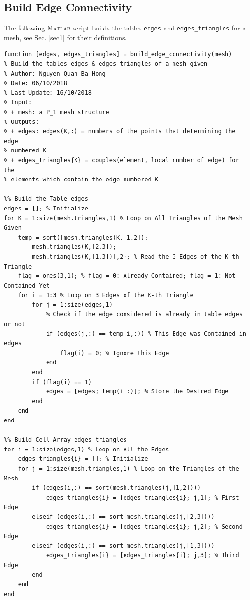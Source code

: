 \documentclass[11pt,a4paper,center,notitlepage]{article}
\numberwithin{equation}{section}
\begin{document}
\subsection{Build Edge Connectivity}\label{sec5.2}
The following \textsc{Matlab} script builds the tables \verb|edges| and \verb|edges_triangles| for a mesh, see Sec. \ref{sec1} for their definitions.
\begin{verbatim}
function [edges, edges_triangles] = build_edge_connectivity(mesh)
% Build the tables edges & edges_triangles of a mesh given
% Author: Nguyen Quan Ba Hong
% Date: 06/10/2018
% Last Update: 16/10/2018
% Input:
% + mesh: a P_1 mesh structure
% Outputs:
% + edges: edges(K,:) = numbers of the points that determining the edge
% numbered K
% + edges_triangles{K} = couples(element, local number of edge) for the
% elements which contain the edge numbered K

%% Build the Table edges
edges = []; % Initialize
for K = 1:size(mesh.triangles,1) % Loop on All Triangles of the Mesh Given
    temp = sort([mesh.triangles(K,[1,2]);
        mesh.triangles(K,[2,3]);
        mesh.triangles(K,[1,3])],2); % Read the 3 Edges of the K-th Triangle
    flag = ones(3,1); % flag = 0: Already Contained; flag = 1: Not Contained Yet
    for i = 1:3 % Loop on 3 Edges of the K-th Triangle
        for j = 1:size(edges,1)
            % Check if the edge considered is already in table edges or not
            if (edges(j,:) == temp(i,:)) % This Edge was Contained in edges
                flag(i) = 0; % Ignore this Edge
            end
        end
        if (flag(i) == 1)
            edges = [edges; temp(i,:)]; % Store the Desired Edge
        end
    end
end

%% Build Cell-Array edges_triangles
for i = 1:size(edges,1) % Loop on All the Edges
    edges_triangles{i} = []; % Initialize
    for j = 1:size(mesh.triangles,1) % Loop on the Triangles of the Mesh
        if (edges(i,:) == sort(mesh.triangles(j,[1,2])))
            edges_triangles{i} = [edges_triangles{i}; j,1]; % First Edge
        elseif (edges(i,:) == sort(mesh.triangles(j,[2,3])))
            edges_triangles{i} = [edges_triangles{i}; j,2]; % Second Edge
        elseif (edges(i,:) == sort(mesh.triangles(j,[1,3])))
            edges_triangles{i} = [edges_triangles{i}; j,3]; % Third Edge
        end
    end
end
\end{verbatim}
\end{document}
